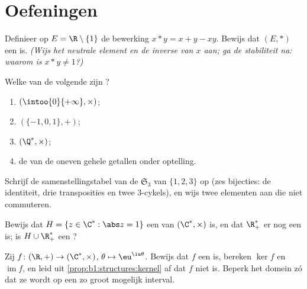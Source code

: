 \section{Oefeningen}

\begin{exercise}[$\star$]\label{exo:b1:structures:1}
Definieer op $E = \R \setminus \{1\}$ de bewerking $x * y = x + y - xy$.
Bewijs dat $(E, *)$ een  is. \emph{(Wijs het neutrale element
en de inverse van $x$ aan; ga de stabiliteit na: waarom is $x * y \neq
1$?)}
\end{exercise}

\begin{exercise}[$\star$]\label{exo:b1:structures:2}
Welke van de volgende zijn ?
\begin{enumerate}
  \item $(\intoo{0}{+\infty}, \times)$;
  \item $(\{-1, 0, 1\}, +)$;
  \item $(\Q^*, \times)$;
  \item de  van de oneven gehele getallen onder optelling.
\end{enumerate}
\end{exercise}

\begin{exercise}[$\star$]\label{exo:b1:structures:3}
Schrijf de samenstellingstabel van de 
$\mathfrak{S}_3$ van $\{1,2,3\}$ op (zes bijecties: de identiteit, drie
transposities en twee $3$-cykels), en wijs twee elementen aan die niet
commuteren.
\end{exercise}

\begin{exercise}[$\star$]\label{exo:b1:structures:4}
Bewijs dat $H = \{z \in \C^* : \abs z = 1\}$ een  van $(\C^*,
\times)$ is, en dat $\R_+^*$ er nog een is; is $H \cup \R_+^*$ een
?
\end{exercise}

\begin{exercise}[$\star\star$]\label{exo:b1:structures:5}
Zij $f \colon (\R, +) \to (\C^*, \times)$, $\theta \mapsto
\eu^{\iu\theta}$. Bewijs dat $f$ een  is, bereken $\ker f$ en
$\operatorname{im} f$, en leid uit
\cref{prop:b1:structures:kernel} af dat $f$ niet  is. Beperk het
domein zó dat ze  wordt op een zo groot mogelijk interval.
\end{exercise}

